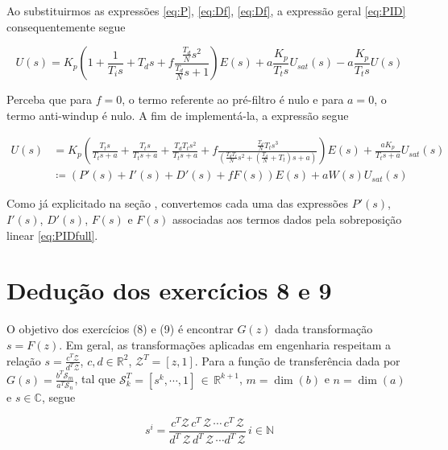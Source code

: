 \documentclass[twoside, fleqn]{article}
\begin{document}
    Ao substituirmos as expressões \eqref{eq:P}, \eqref{eq:Df}, \eqref{eq:Df}, a expressão geral \eqref{eq:PID} consequentemente segue 
    
        \begin{equation}
            U(s) = K_p \left(1 + \frac{1}{T_i s} + T_d s + f \frac{\frac{T_d}{N} s^2}{\frac{T_d}{N}s+1}\right) E(s) +  a \frac{K_p}{T_t s} U_{sat}(s) - a \frac{K_p}{T_t s} U(s)
            \label{eq:PIDaf}
        \end{equation}
    
    Perceba que para $f=0$, o termo referente ao pré-filtro é nulo e para $a = 0$, o termo anti-windup é nulo. A fim de implementá-la, a expressão segue
    
        \begin{equation}
            \begin{split}
                U(s) &= K_p \left(\frac{T_t s}{T_t s + a} + \frac{T_t s}{T_t s + a} + \frac{T_d T_t s^2}{T_t s + a} + f \frac{\frac{T_d}{N} T_t s^3}{\left(\frac{T_d T_t}{N} s^2 + \left(\frac{T_d}{N} + T_t\right) s + a\right)} \right) E(s) + \frac{a K_p}{T_t s + a} U_{sat}(s) \\
                & \coloneqq \left(P'(s) + I'(s) + D'(s) + f F(s)\right) E(s) + a W(s) U_{sat}(s)
            \end{split}
            \label{eq:PIDfull}
        \end{equation}
    
    Como já explicitado na seção , convertemos cada uma das expressões $P'(s)$, $I'(s)$, $D'(s)$, $F(s)$ e $F(s)$ associadas aos termos dados pela sobreposição linear \eqref{eq:PIDfull}.

\section*{Dedução dos exercícios 8 e 9}
\label{sec:deducao89}

    O objetivo dos exercícios (8) e (9) é encontrar $G(z)$ dada transformação $s = F(z)$. Em geral, as transformações aplicadas em engenharia respeitam a relação $s = \frac{c^T \mathcal{Z}}{d^T \mathcal{Z}}$, $c, d \in \mathbb{R}^2$, $\mathcal{Z}^T = [z, 1] $. Para a função de transferência dada por $G(s) = \frac{b^T \mathcal{S}_m}{a^T \mathcal{S}_n}$, tal que $\mathcal{S}_k^T = [s^k, \cdots, 1]  \, \in \, \mathbb{R}^{k+1}$, $m = \dim(b)$ e $n = \dim(a)$ e $s \in \mathbb{C}$, segue
    
    \begin{equation}
        s^i = \frac{c^T \mathcal{Z} \, c^T \, \mathcal{Z} \, \cdots \, c^T \, \mathcal{Z}}{d^T \, \mathcal{Z} \, d^T \, \mathcal{Z} \, \cdots d^T \, \mathcal{Z}} \, i \in \mathbb{N}
        \label{eq:sexpi}
    \end{equation}
    
\end{document}
